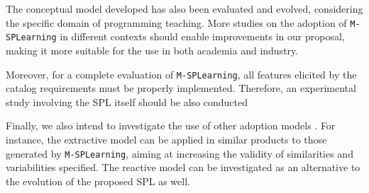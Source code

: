The conceptual model developed has also been evaluated and evolved, considering the specific domain of programming teaching. More studies on the adoption of \texttt{M-SPLear\allowbreak ning} in different contexts should enable improvements in our proposal, making it more suitable for the use in both academia and industry.

Moreover, for a complete evaluation of \texttt{M-SPLear\allowbreak ning}, all features elicited by the catalog requirements must be properly implemented. Therefore, an experimental study involving the SPL itself should be also conducted

Finally, we also intend to investigate the use of other adoption models \cite{krueger02}. For instance, the extractive model can be applied in similar products to those generated by \texttt{M-SPLear\allowbreak ning}, aiming at increasing the validity of similarities and variabilities specified. The reactive model can be investigated as an alternative to the evolution of the proposed SPL as well.